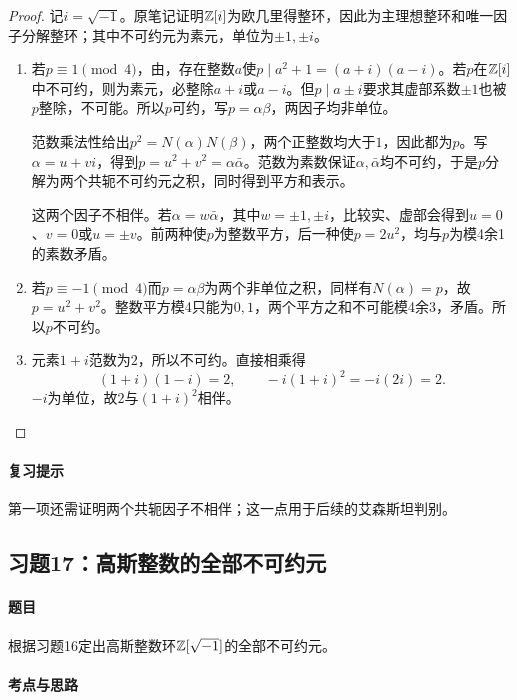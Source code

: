 \begin{proof}

记$i=\sqrt{-1}$。原笔记证明$\mathbb Z[i]$为欧几里得整环，因此为主理想整环和唯一因子分解整环；其中不可约元为素元，单位为$\pm1,\pm i$。
\begin{enumerate}[label=(\roman*)]
\item 若$p\equiv1\pmod4$，由，存在整数$a$使$p\mid a^2+1=(a+i)(a-i)$。若$p$在$\mathbb Z[i]$中不可约，则为素元，必整除$a+i$或$a-i$。但$p\mid a\pm i$要求其虚部系数$\pm1$也被$p$整除，不可能。所以$p$可约，写$p=\alpha\beta$，两因子均非单位。

范数乘法性给出$p^2=N(\alpha)N(\beta)$，两个正整数均大于$1$，因此都为$p$。写$\alpha=u+vi$，得到$p=u^2+v^2=\alpha\bar\alpha$。范数为素数保证$\alpha,\bar\alpha$均不可约，于是$p$分解为两个共轭不可约元之积，同时得到平方和表示。

这两个因子不相伴。若$\alpha=w\bar\alpha$，其中$w=\pm1,\pm i$，比较实、虚部会得到$u=0$、$v=0$或$u=\pm v$。前两种使$p$为整数平方，后一种使$p=2u^2$，均与$p$为模4余1的素数矛盾。
\item 若$p\equiv-1\pmod4$而$p=\alpha\beta$为两个非单位之积，同样有$N(\alpha)=p$，故$p=u^2+v^2$。整数平方模4只能为$0,1$，两个平方之和不可能模4余3，矛盾。所以$p$不可约。
\item 元素$1+i$范数为$2$，所以不可约。直接相乘得
\[
(1+i)(1-i)=2,\qquad -i(1+i)^2=-i(2i)=2.
\]
$-i$为单位，故$2$与$(1+i)^2$相伴。
\end{enumerate}

\end{proof}

\paragraph{复习提示}

第一项还需证明两个共轭因子不相伴；这一点用于后续的艾森斯坦判别。

\subsection{习题17：高斯整数的全部不可约元}

\label{ex:4:17}

\paragraph{题目}

根据习题16定出高斯整数环$\mathbb Z[\sqrt{-1}]$的全部不可约元。

\paragraph{考点与思路}

